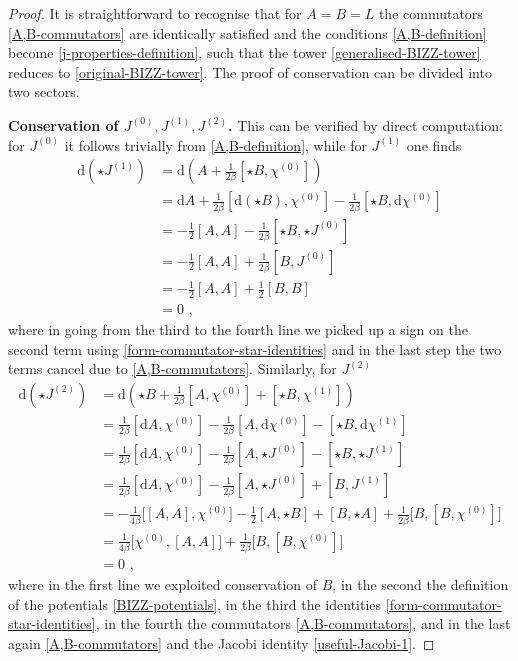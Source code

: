 \documentclass[10pt,a4paper]{amsart}
\begin{document}
\begin{proof} It is straightforward to recognise that for $A=B=L$ the commutators \eqref{A,B-commutators} are identically satisfied and the conditions \eqref{A,B-definition} become \eqref{j-properties-definition}, such that the tower \eqref{generalised-BIZZ-tower} reduces to \eqref{original-BIZZ-tower}. The proof of conservation can be divided into two sectors.

\textbf{Conservation of $J^{(0)},J^{(1)},J^{(2)}$.} \qquad This can be verified by direct computation: for $J^{(0)}$ it follows trivially from \eqref{A,B-definition}, while for $J^{(1)}$ one finds 
\begin{equation}
\begin{aligned}
\mathrm{d}(\star J^{(1)})&=\mathrm{d}(A+\tfrac{1}{2\beta}[\star B,\chi^{(0)}])
\\
&=\mathrm{d}A+\tfrac{1}{2\beta}[\mathrm{d}(\star B),\chi^{(0)}]-\tfrac{1}{2\beta}[\star B,\mathrm{d}\chi^{(0)}]
\\
&=-\tfrac{1}{2}[A,A]-\tfrac{1}{2\beta}[\star B,\star J^{(0)}]
\\
&=-\tfrac{1}{2}[A,A]+\tfrac{1}{2\beta}[ B, J^{(0)}]
\\
&=-\tfrac{1}{2}[A,A]+\tfrac{1}{2}[ B, B]
\\
&=0 \,\, ,
\end{aligned}
\end{equation}
where in going from the third to the fourth line we picked up a sign on the second term using \eqref{form-commutator-star-identities} and in the last step the two terms cancel due to \eqref{A,B-commutators}. Similarly, for $J^{(2)}$ 
\begin{equation}
\begin{aligned}
\mathrm{d}(\star J^{(2)})&=\mathrm{d}(\star B+\tfrac{1}{2\beta}[A,\chi^{(0)}]+[\star B,\chi^{(1)}])
\\
&=\tfrac{1}{2\beta}[\mathrm{d}A,\chi^{(0)}]-\tfrac{1}{2\beta}[A,\mathrm{d}\chi^{(0)}]-[\star B,\mathrm{d}\chi^{(1)}]
\\
&=\tfrac{1}{2\beta}[\mathrm{d}A,\chi^{(0)}]-\tfrac{1}{2\beta}[A,\star J^{(0)}]-[\star B,\star J^{(1)}]
\\
&=\tfrac{1}{2\beta}[\mathrm{d}A,\chi^{(0)}]-\tfrac{1}{2\beta}[A,\star J^{(0)}]+[ B, J^{(1)}]
\\
&=-\tfrac{1}{4\beta}\bigl[[A,A],\chi^{(0)}\bigr]-\tfrac{1}{2}[A,\star B]+[B,\star A]+\tfrac{1}{2\beta}\bigl[B,[B,\chi^{(0)}]\bigr]
\\
&=\tfrac{1}{4\beta}\bigl[\chi^{(0)},[A,A]\bigr]+\tfrac{1}{2\beta}\bigl[B,[B,\chi^{(0)}]\bigr]
\\
&=0 \,\, ,
\end{aligned}
\end{equation}
where in the first line we exploited conservation of $B$, in the second the definition of the potentials \eqref{BIZZ-potentials}, in the third the identities \eqref{form-commutator-star-identities}, in the fourth the commutators \eqref{A,B-commutators}, and in the last again \eqref{A,B-commutators} and the Jacobi identity \eqref{useful-Jacobi-1}.



\end{proof}
\end{document}
